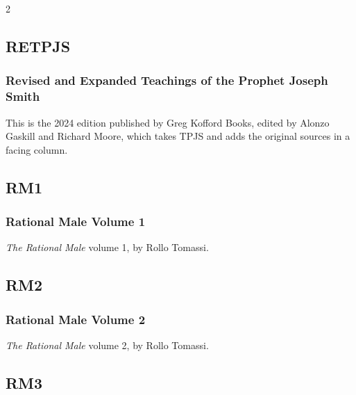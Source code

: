 \begin{multicols}{2}
	\subsection*{RETPJS}
	
		\subsubsection*{Revised and Expanded Teachings of the Prophet Joseph Smith}
		
			This is the 2024 edition published by Greg Kofford Books, edited by Alonzo Gaskill and Richard Moore, which takes TPJS and adds the original sources in a facing column. 
			
	\subsection*{RM1}
	
		\subsubsection*{Rational Male Volume 1}
		
			\textit{The Rational Male} volume 1, by Rollo Tomassi.
			
	\subsection*{RM2}
	
		\subsubsection*{Rational Male Volume 2}
		
			\textit{The Rational Male} volume 2, by Rollo Tomassi.
			
	\subsection*{RM3}
	

\end{multicols}
